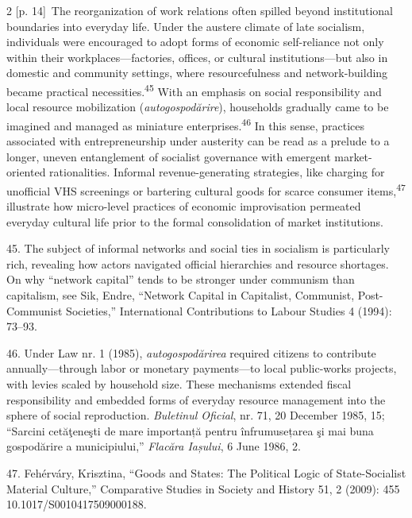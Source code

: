 \documentclass[10pt,a4paper]{article}
\begin{document}
\begin{paracol}{2}
{\scriptsize\color{gray} [p. 14]}\ The reorganization of work relations often spilled beyond institutional boundaries into everyday life. Under the austere climate of late socialism, individuals were encouraged to adopt forms of economic self-reliance not only within their workplaces—factories, offices, or cultural institutions—but also in domestic and community settings, where resourcefulness and network-building became practical necessities.\nobreak\textsuperscript{45} With an emphasis on social responsibility and local resource mobilization (\textit{autogospodărire}), households gradually came to be imagined and managed as miniature enterprises.\nobreak\textsuperscript{46} In this sense, practices associated with entrepreneurship under austerity can be read as a prelude to a longer, uneven entanglement of socialist governance with emergent market-oriented rationalities. Informal revenue-generating strategies, like charging for unofficial VHS screenings or bartering cultural goods for scarce consumer items,\nobreak\textsuperscript{47} illustrate how micro-level practices of economic improvisation permeated everyday cultural life prior to the formal consolidation of market institutions.\par{\small 45. The subject of informal networks and social ties in socialism is particularly rich, revealing how actors navigated official hierarchies and resource shortages. On why “network capital” tends to be stronger under communism than capitalism, see Sik, Endre, “Network Capital in Capitalist, Communist, Post-Communist Societies,” International Contributions to Labour Studies 4 (1994): 73–93.\par}{\small 46. Under Law nr. 1 (1985), \textit{autogospodărirea} required citizens to contribute annually—through labor or monetary payments—to local public-works projects, with levies scaled by household size. These mechanisms extended fiscal responsibility and embedded forms of everyday resource management into the sphere of social reproduction. \textit{Buletinul Oficial}, nr. 71, 20 December 1985, 15; “Sarcini cetăţeneşti de mare importanță pentru înfrumusețarea şi mai buna gospodărire a municipiului,” \textit{Flacăra Iașului}, 6 June 1986, 2.\par}{\small 47. Fehérváry, Krisztina, “Goods and States: The Political Logic of State-Socialist Material Culture,” Comparative Studies in Society and History 51, 2 (2009): 455 10.1017/S0010417509000188.\par}
\switchcolumn*

\end{paracol}
\end{document}
